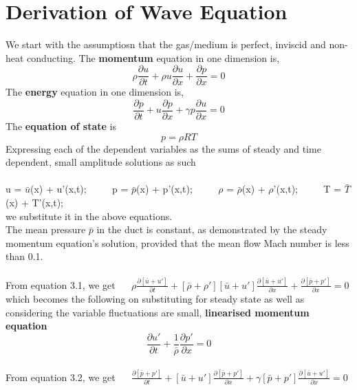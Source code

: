 \documentclass[8pt]{article} %
\begin{document}
\section{Derivation of Wave Equation}
We start with the assumptiosn that the gas/medium is perfect, inviscid and non-heat conducting. 
The \textbf{momentum} equation in one dimension is,
\begin{equation}
\rho \frac{\partial u}{\partial t} + \rho u \frac{\partial u}{\partial x} + \frac{\partial p}{\partial x} = 0
\end{equation}\label{eq:3.1}
The \textbf{energy} equation in one dimension is,
\begin{equation}
\frac{\partial p}{\partial t} + u \frac{\partial p}{\partial x} + \gamma p \frac{\partial u}{\partial x} = 0
\end{equation}\label{eq:3.2}
The \textbf{equation of state} is
\begin{equation}
p = \rho R T
\end{equation}\label{eq:3.3}
Expressing each of the dependent variables as the sums of steady and time dependent, small amplitude solutions as such\\\\
u = $\bar{u}$(x) + u'(x,t); $\quad\quad$   p = $\bar{p}$(x) + p'(x,t); $\quad\quad$   $\rho$ = $\bar{\rho}$(x) + $\rho$'(x,t); $\quad\quad$ T = $\bar{T}$(x) + T'(x,t); \\
we substitute it in the above equations.\\
The mean pressure $\bar{p}$ in the duct is constant, as demonstrated by the steady momentum equation's solution, provided that the mean flow Mach number is less than 0.1.\\\\
From equation 3.1, we get $\quad$ $\rho \frac{\partial [\bar{u} + u'] }{\partial t} + [\bar{\rho} + \rho']  [\bar{u} + u'] \frac{\partial [\bar{u} + u'] }{\partial x} + \frac{\partial [\bar{p} + p'] }{\partial x} = 0 $\\ which becomes the following on substituting for steady state as well as considering the variable fluctuations are small, \textbf{linearised momentum equation}
\begin{equation}
\frac{\partial u'}{\partial t} + \frac{1}{\bar{\rho}} \frac{\partial p'}{\partial x} = 0
\end{equation}\\
From equation 3.2, we get $\quad$ $\frac{\partial [\bar{p} + p']}{\partial t} + [\bar{u} + u'] \frac{\partial [\bar{p} + p']}{\partial x} + \gamma [\bar{p} + p'] \frac{\partial [\bar{u} + u']}{\partial x} = 0$\\
\end{document}
